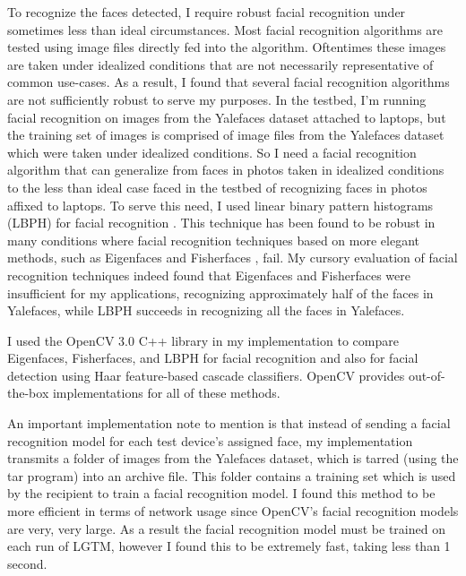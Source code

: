 \documentclass[12pt]{report}
\begin{document}
To recognize the faces detected, I require robust facial recognition under sometimes less than ideal circumstances. Most facial recognition algorithms are tested using image files directly fed into the algorithm. Oftentimes these images are taken under idealized conditions that are not necessarily representative of common use-cases. As a result, I found that several facial recognition algorithms are not sufficiently robust to serve my purposes. In the testbed, I'm running facial recognition on images from the Yalefaces dataset attached to laptops, but the training set of images is comprised of image files from the Yalefaces \cite{FisherfacesBelhumeur1997} dataset which were taken under idealized conditions. So I need a facial recognition algorithm that can generalize from faces in photos taken in idealized conditions to the less than ideal case faced in the testbed of recognizing faces in photos affixed to laptops. To serve this need, I used linear binary pattern histograms (LBPH) for facial recognition \cite{LBPHAhonen2004,LearningMultiScalBlockLBPHLiao2007}. This technique has been found to be robust in many conditions where facial recognition techniques based on more elegant methods, such as Eigenfaces \cite{EigenfacesTurk1991} and Fisherfaces \cite{FisherfacesBelhumeur1997}, fail. My cursory evaluation of facial recognition techniques indeed found that Eigenfaces and Fisherfaces were insufficient for my applications, recognizing approximately half of the faces in Yalefaces, while LBPH succeeds in recognizing all the faces in Yalefaces. \par

I used the OpenCV 3.0 \cite{OpenCV} C++ library in my implementation to compare Eigenfaces, Fisherfaces, and LBPH for facial recognition and also for facial detection using Haar feature-based cascade classifiers. OpenCV provides out-of-the-box implementations for all of these methods. \par

An important implementation note to mention is that instead of sending a facial recognition model for each test device's assigned face, my implementation transmits a folder of images from the Yalefaces dataset, which is tarred (using the tar program) into an archive file. This folder contains a training set which is used by the recipient to train a facial recognition model. I found this method to be more efficient in terms of network usage since OpenCV's facial recognition models are very, very large. As a result the facial recognition model must be trained on each run of LGTM, however I found this to be extremely fast, taking less than 1 second. \par
\end{document}
